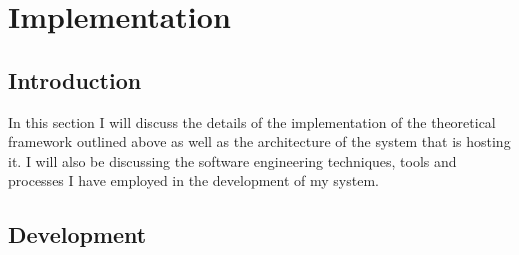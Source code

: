 \documentclass[]{final_report}
\begin{document}
\section{Implementation}
\subsection{Introduction}
In this section I will discuss the details of the implementation of the theoretical framework outlined above as well as the architecture of the system that is hosting it. I will also be discussing the software engineering techniques, tools and processes I have employed in the development of my system.

\subsection{Development}
\end{document}
